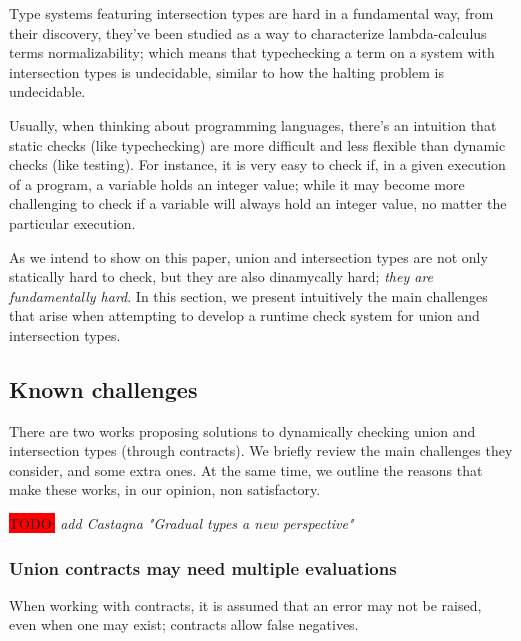 \newcommand{\TODO}[1]{\colorbox{red}{TODO:} \emph{#1}}
\newcommand{\moral}[1]{\noindent $\hookrightarrow$ \textsc{#1}}

Type systems featuring intersection types are hard in a fundamental way,
from their discovery, they've been studied as a way to characterize
lambda-calculus terms normalizability; which means that typechecking a
term on a system with intersection types is undecidable,
similar to how the halting problem is undecidable.

Usually, when thinking about programming languages, there's an intuition
that static checks (like typechecking) are more difficult and less flexible
than dynamic checks (like testing). For instance, it is very easy to check if,
in a given execution of a program, a variable holds an integer value; while it
may become more challenging to check if a variable will always hold an integer value,
no matter the particular execution.

As we intend to show on this paper, union and intersection types are not only
statically hard to check, but they are also dinamycally hard;
\emph{they are fundamentally hard}.
In this section, we present intuitively the main challenges that arise
when attempting to develop a runtime check system for union and intersection types.

\subsection{Known challenges}

There are two works proposing solutions to dynamically checking union and intersection
types (through contracts). 
We briefly review the main challenges they consider, and some extra ones.
At the same time, we outline the reasons that make these works,
in our opinion, non satisfactory.

\TODO{add Castagna "Gradual types a new perspective"}

\subsubsection*{Union contracts may need multiple evaluations}

When working with contracts, it is assumed that an error may not be raised, even
when one may exist; contracts allow false negatives.


